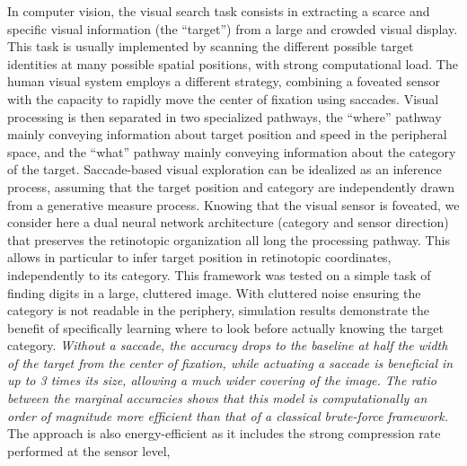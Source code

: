 In computer vision, the visual search task consists in extracting a scarce and specific visual information (the ``target'') from a large and crowded visual display. This task is usually implemented by scanning the different possible target identities at many possible spatial positions, with strong computational load. The human visual system employs a different strategy, combining a foveated sensor with the capacity to rapidly move the center of fixation using saccades. Visual processing is then separated in two specialized pathways, the ``where'' pathway mainly conveying information about target position and speed in the peripheral space, and the ``what'' pathway mainly conveying information about the category of the target. 
Saccade-based visual exploration can be idealized as an inference process, assuming that the target position and category are independently drawn from a generative measure process. Knowing that the visual sensor is foveated, we consider here a dual neural network architecture (category and  sensor direction) that preserves the retinotopic organization all long the processing pathway. This allows in particular to infer target position in retinotopic coordinates, independently to its category. This framework was tested on a simple task of finding digits in a large, cluttered image. With cluttered noise ensuring the category is not readable in the periphery, simulation results demonstrate the benefit of specifically learning where to look before actually knowing the target category. \ICANN \emph{Without a saccade, the accuracy drops to the baseline at half the width of the target from the center of fixation, while actuating a saccade is beneficial in up to 3 times its size, allowing a much wider covering of the image. The ratio between the marginal accuracies shows that this model is computationally an order of magnitude more efficient than that of a classical brute-force framework.} %
\fi
The approach is also energy-efficient as it includes the strong compression rate performed at the sensor level, %
